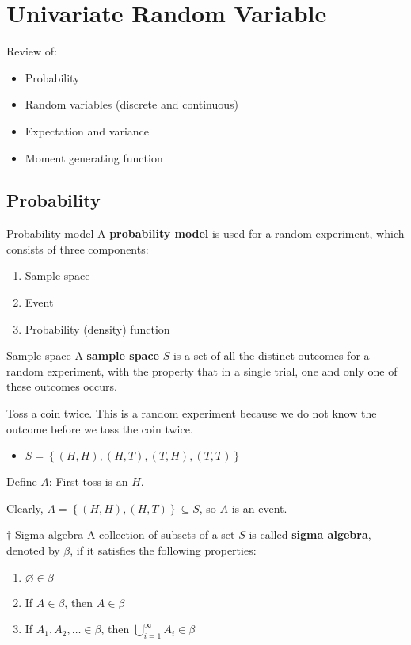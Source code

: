 \setcounter{chapter}{1}
\chapter{Univariate Random Variable}
Review of:
\begin{itemize}
    \item Probability
    \item Random variables (discrete and continuous)
    \item Expectation and variance
    \item Moment generating function
\end{itemize}

\section{Probability}
\begin{Definition}{Probability model}{}
    A \textbf{probability model} is used for a random
    experiment, which consists of three components:
    \begin{enumerate}[label=(\Roman*)]
        \item Sample space
        \item Event
        \item Probability (density) function
    \end{enumerate}
\end{Definition}

\begin{Definition}{Sample space}{}
    A \textbf{sample space} $ S $ is a set of all the distinct outcomes
    for a random experiment, with the property that in a single trial,
    one and only one of these outcomes occurs.
\end{Definition}

\begin{Example}{}{}
    Toss a coin twice. This is a random experiment because
    we do not know the outcome before we toss the coin twice.
    \begin{itemize}
        \item $ S=\left\{ (H,H),(H,T),(T,H),(T,T)\right\} $
    \end{itemize}
    Define $ A $: First toss is an $ H $.

    Clearly, $ A=\left\{ (H,H),(H,T)\right\}\subseteq S $, so $ A $ is an event.
\end{Example}

\begin{Definition}{$ \dagger $ Sigma algebra}{}
    A collection of subsets of a set $ S $ is called \textbf{sigma algebra},
    denoted by $ \beta $, if it satisfies the following properties:
    \begin{enumerate}[label=(\Roman*)]
        \item $ \varnothing\in \beta $
        \item If $ A\in\beta $, then $ \bar{A}\in\beta $
        \item If $ A_1,A_2,\ldots\in \beta $, then $ \bigcup\limits_{i=1}^{\infty}A_i\in \beta $
    \end{enumerate}
\end{Definition}

